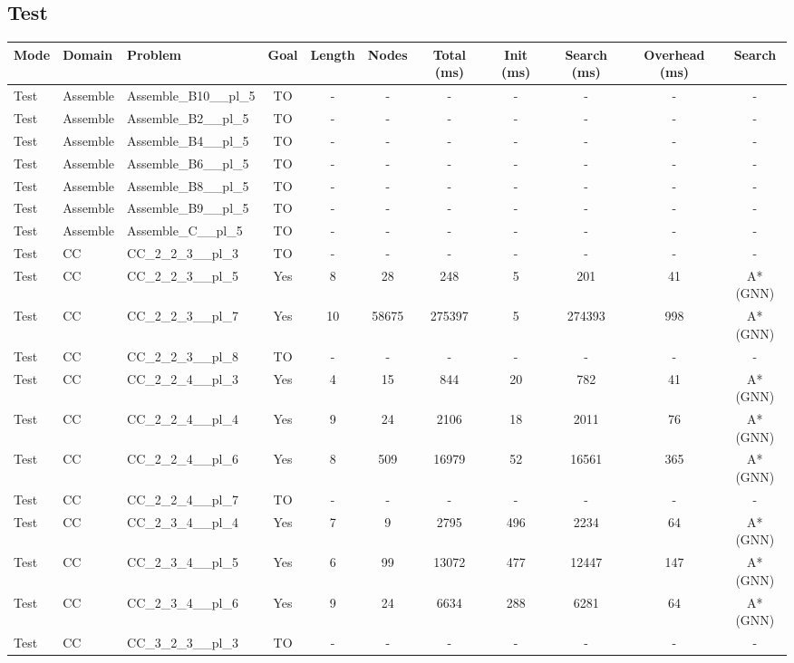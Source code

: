 \documentclass{article}
\begin{document}
\subsection*{Test}
\begin{tabular}{lllcccccccc}
\toprule
Mode & Domain & Problem & Goal & Length & Nodes & Total (ms) & Init (ms) & Search (ms) & Overhead (ms) & Search \\
\midrule
Test & Assemble & Assemble\_B10\_\_pl\_5 & TO & - & - & - & - & - & - & - \\
Test & Assemble & Assemble\_B2\_\_pl\_5 & TO & - & - & - & - & - & - & - \\
Test & Assemble & Assemble\_B4\_\_pl\_5 & TO & - & - & - & - & - & - & - \\
Test & Assemble & Assemble\_B6\_\_pl\_5 & TO & - & - & - & - & - & - & - \\
Test & Assemble & Assemble\_B8\_\_pl\_5 & TO & - & - & - & - & - & - & - \\
Test & Assemble & Assemble\_B9\_\_pl\_5 & TO & - & - & - & - & - & - & - \\
Test & Assemble & Assemble\_C\_\_pl\_5 & TO & - & - & - & - & - & - & - \\
Test & CC & CC\_2\_2\_3\_\_pl\_3 & TO & - & - & - & - & - & - & - \\
Test & CC & CC\_2\_2\_3\_\_pl\_5 & Yes & 8 & 28 & 248 & 5 & 201 & 41 & A*(GNN) \\
Test & CC & CC\_2\_2\_3\_\_pl\_7 & Yes & 10 & 58675 & 275397 & 5 & 274393 & 998 & A*(GNN) \\
Test & CC & CC\_2\_2\_3\_\_pl\_8 & TO & - & - & - & - & - & - & - \\
Test & CC & CC\_2\_2\_4\_\_pl\_3 & Yes & 4 & 15 & 844 & 20 & 782 & 41 & A*(GNN) \\
Test & CC & CC\_2\_2\_4\_\_pl\_4 & Yes & 9 & 24 & 2106 & 18 & 2011 & 76 & A*(GNN) \\
Test & CC & CC\_2\_2\_4\_\_pl\_6 & Yes & 8 & 509 & 16979 & 52 & 16561 & 365 & A*(GNN) \\
Test & CC & CC\_2\_2\_4\_\_pl\_7 & TO & - & - & - & - & - & - & - \\
Test & CC & CC\_2\_3\_4\_\_pl\_4 & Yes & 7 & 9 & 2795 & 496 & 2234 & 64 & A*(GNN) \\
Test & CC & CC\_2\_3\_4\_\_pl\_5 & Yes & 6 & 99 & 13072 & 477 & 12447 & 147 & A*(GNN) \\
Test & CC & CC\_2\_3\_4\_\_pl\_6 & Yes & 9 & 24 & 6634 & 288 & 6281 & 64 & A*(GNN) \\
Test & CC & CC\_3\_2\_3\_\_pl\_3 & TO & - & - & - & - & - & - & - \\

\end{tabular}
\end{document}
